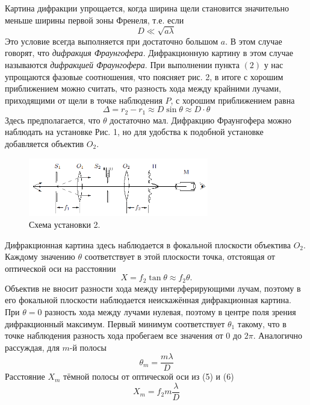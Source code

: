\documentclass[a4paper,12pt]{report}
\begin{document}
Картина дифракции упрощается, когда ширина щели становится значительно меньше ширины первой зоны Френеля, т.е. если 
\begin{equation}
D \ll\sqrt{a \lambda} 
\end{equation}	
Это условие всегда выполняется при достаточно большом $a$. В этом случае говорят, что \textit{дифракция Фраунгофера}. Дифракционную картину в этом случае называются \textit{дифракцией Фраунгофера}. При выполнении пункта $(2)$ у нас упрощаются фазовые соотношения, что поясняет рис. 2, в итоге с хорошим приближением можно считать, что разность хода между крайними лучами, приходящими от щели в точке наблюдения $P$, с хорошим приближением равна 
\begin{equation}
\Delta = r_2 - r_1 \approx D \sin \theta \approx D \cdot \theta
\end{equation}
Здесь предполагается, что $\theta$ достаточно мал.
Дифракцию Фраунгофера можно наблюдать на установке Рис. 1, но для удобства к подобной установке добавляется объектив $O_2$.

\begin{figure}[H]
\includegraphics[width = 0.7\textwidth]{3.png}
\centering
\caption{Схема установки 2.}
\end{figure}
Дифракционная картина здесь наблюдается в фокальной плоскости объектива $O_2$. Каждому значению $\theta$ соответствует в этой плоскости точка, отстоящая от оптической оси на расстоянии 
\begin{equation}
X = f_2 \tan \theta \approx f_2 \theta.
\end{equation}
Объектив не вносит разности хода между интерферирующими лучам, поэтому в его фокальной плоскости наблюдается неискажённая дифракционная картина. При $\theta = 0$ разность хода между лучами нулевая, поэтому в центре поля зрения дифракционный максимум. Первый минимум соответствует $\theta_1$ такому, что в точке наблюдения разность хода пробегаем все значения от 0 до $2\pi$. Аналогично рассуждая, для $m$-й полосы
\begin{equation}
\theta_m = \frac{m \lambda}{D}
\end{equation}
Расстояние $X_m$ тёмной полосы от оптической оси из (5) и (6)
\begin{equation}
X_m = f_2m\frac{\lambda}{D}
\end{equation}
\end{document}

